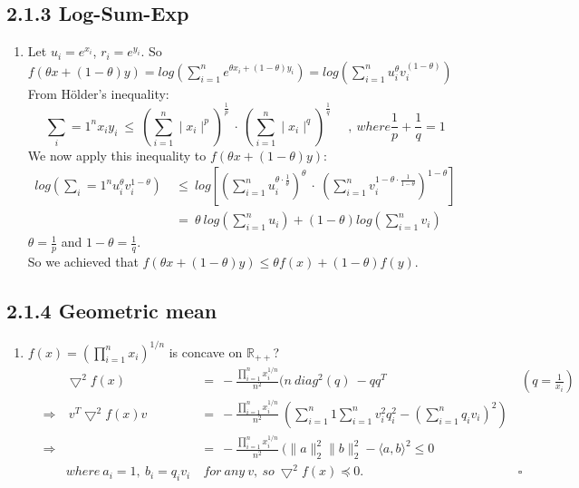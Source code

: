 \documentclass{report}
\begin{document}
	\subsection*{2.1.3 Log-Sum-Exp}
		\begin{enumerate}[]
			\item Let $u_i = e^{x_i}$, $r_i = e^{y_i}$. So $f(\theta x + (1-\theta )y) = log ( \sum_{i=1}^n e^{\theta x_i+(1-\theta )y_i}) = log(\sum_{i=1}^n u_i^{\theta} v_i^{(1-\theta )})$ \\
			From Hölder's inequality:
			\[
				\sum_i=1^n x_i y_i \ \leq \ (\sum_{i=1}^n \mid x_i \mid^p)^{\frac{1}{p}} \ \cdot \ (\sum_{i=1}^n \mid x_i \mid^q)^{\frac{1}{q}} \ \ \ \ \ \ , \ where \frac{1}{p} + \frac{1}{q} = 1
			\]
			We now apply this inequality to $f(\theta x + (1-\theta ) y)$:
			\begin{align*}
				log(\sum_i=1^n u_i^{\theta}v_i^{1-\theta}) \ & \leq \ log[(\sum_{i=1}^n u_i ^{\theta \cdot \frac{1}{\theta}})^{\theta} \ \cdot \ (\sum_{i=1}^n v_i ^{1-\theta \cdot \frac{1}{1-\theta}})^{1-\theta}] \\
				& = \ \theta \ log (\sum_{i=1}^n u_i) + (1-\theta ) log (\sum_{i=1}^n v_i)
			\end{align*}
			$\theta = \frac{1}{p}$ and $1-\theta = \frac{1}{q}$. \\
			So we achieved that $f(\theta x + (1-\theta) y) \leq \theta f(x) + (1-\theta) f(y)$. 
		\end{enumerate}
	
	\subsection*{2.1.4 Geometric mean}
		\begin{enumerate}[]
			\item $f(x) = (\prod_{i=1}^n x_i)^{1/n}$ is concave on $\mathbb{R}_{++}$?
			\begin{align*}
				& & \bigtriangledown^2 f(x) \ & = \ -\frac{\prod_{i=1}^n x_i^{1/n}}{n^2} (n \ diag^2(q) \ - qq^T \ & \ (q = \frac{1}{x_i}) \\
				& \Rightarrow & \ v^T \bigtriangledown^2f(x)v \ & = \ -\frac{\prod_{i=1}^n x_i^{1/n}}{n^2} \ (\sum_{i=1}^n 1 \sum_{i=1}^n v_i^2 q_i^2 - (\sum_{i=1}^n q_iv_i)^2) \\
				& \Rightarrow & \ \ & = \ -\frac{\prod_{i=1}^n x_i^{1/n}}{n^2} \ ( \| a \|_2^2 \| b \|_2^2 - \langle a,b \rangle^2 \leq 0 \\
				& & where \ a_i =1, \ b_i = q_iv_i & \ for \ any \ v, \ so \ \bigtriangledown^2 f(x) \preceq 0.  & \square
			\end{align*}
		\end{enumerate}
	
\end{document}
